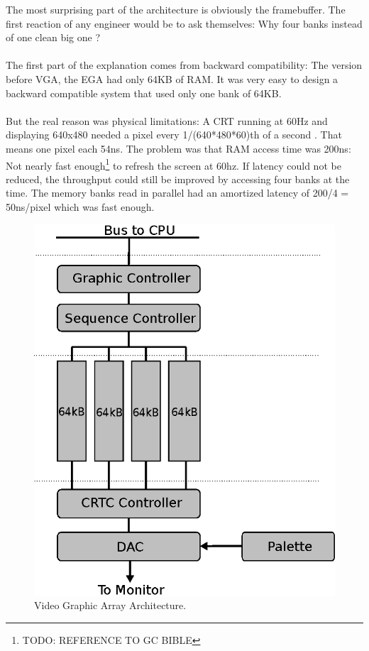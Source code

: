 \documentclass[book.tex]{subfiles}
\begin{document}
The most surprising part of the architecture is obviously the framebuffer. The first reaction of any engineer would be to ask themselves: Why four banks instead of one clean big one ?\\
\\
The first part of the explanation comes from backward compatibility: The version before VGA, the EGA had only 64KB of RAM. It was very easy to design a backward compatible system that used only one bank of 64KB.\\
\\
But the real reason was physical limitations: A CRT running at 60Hz and displaying 640x480 needed a pixel every 1/(640*480*60)th of a second . That means one pixel each 54ns. The problem was that RAM access time was 200ns: Not nearly fast enough\footnote{TODO: REFERENCE TO GC BIBLE} to refresh the screen at 60hz. If latency could not be reduced, the throughput could still be improved by accessing four banks at the time. The memory banks read in parallel had an amortized latency of 200/4 = 50ns/pixel which was fast enough.


\begin{figure}[H]
\centering
\includegraphics[scale=1.2]{imgs/vga.eps}
\caption{Video Graphic Array Architecture.}
\label{fig:vga_arch}
\end{figure}
\end{document}
